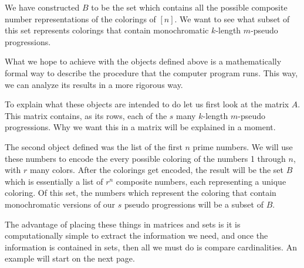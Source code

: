 \documentclass{article}
\theoremstyle{definition}
\theoremstyle{remark}
\theoremstyle{definition}
\begin{document}
\noindent We have constructed $B$ to be the set which contains all the possible composite number representations of the colorings of $[n]$. We want to see what subset of this set represents colorings that contain monochromatic $k$-length $m$-pseudo progressions.

\newpage

\noindent What we hope to achieve with the objects defined above is a mathematically formal way to describe the procedure that the computer program runs. This way, we can analyze its results in a more rigorous way. \par 
To explain what these objects are intended to do let us first look at the matrix $A$. This matrix contains, as its rows, each of the $s$ many $k$-length $m$-pseudo progressions. Why we want this in a matrix will be explained in a moment.\par 
The second object defined was the list of the first $n$ prime numbers. We will use these numbers to encode the every possible coloring of the numbers 1 through $n$, with $r$ many colors. After the colorings get encoded, the result will be the set $B$ which is essentially a list of $r^n$ composite numbers, each representing a unique coloring. Of this set, the numbers which represent the coloring that contain monochromatic versions of our $s$ pseudo progressions will be a subset of $B$. \par 
The advantage of placing these things in matrices and sets is it is computationally simple to extract the information we need, and once the information is contained in sets, then all we must do is compare cardinalities. An example will start on the next page.

\newpage
\end{document}
